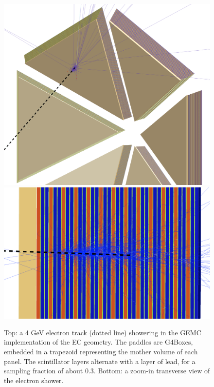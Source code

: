 \begin{figure}
	\centering
	\includegraphics[width=0.99\columnwidth,keepaspectratio]{img/ecGeometry.png}
	\includegraphics[width=0.99\columnwidth,keepaspectratio]{img/ecDetail.png}
	\caption{Top: a 4 GeV electron track (dotted line) showering in the GEMC implementation of the EC geometry.
            The paddles are G4Boxes, embedded in a trapezoid representing the mother volume of each panel.
            The scintillator layers alternate with a layer of lead, for a sampling fraction of about 0.3.
            Bottom: a zoom-in transverse view of the electron shower.}
	\label{fig:ecGeometry}
\end{figure}



